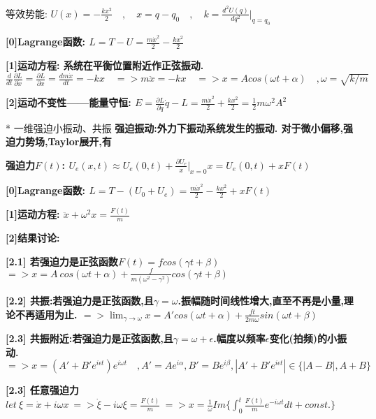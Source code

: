             等效势能:
            $U(x) = - \frac{k x^2}{2} \quad , \quad x = q-q_0 \quad ,\quad k = \frac{d^2 U(q)}{dq^2}|_{q=q_0}$
            
            \bf{[0]Lagrange函数}:
            $L = T - U = \frac{m \dot x^2}{2} - \frac{k x^2}{2}$
            
            \bf{[1]运动方程}: 系统在平衡位置附近作正弦振动.
            $\frac{d}{dt} \frac{∂ L}{∂ \dot x} = \frac{∂ L}{∂ x} = \frac{d m\dot x}{dt} = -kx \quad => m \ddot x = -kx \quad => x = A cos(\omega t + \alpha) \quad , \omega = \sqrt{k/m}$
            
            \bf{[2]运动不变性——能量守恒}:
            $E = \frac{∂ L}{∂ \dot q}\dot q - L = \frac{m \dot x^2}{2} + \frac{k x^2}{2} = \frac{1}{2} m \omega^2 A^2$


        * 一维强迫小振动、共振
            \bf{强迫振动}:外力下振动系统发生的振动. 对于微小偏移,强迫力势场,Taylor展开,有
            
            \bf{强迫力$F(t)$}:
                $U_e(x,t) \approx U_e(0,t) + \frac{∂ U_e}{x}|_{x=0}x = U_e(0,t) + xF(t)$
            
            \bf{[0]Lagrange函数}:
                $L = T - (U_0 + U_e) = \frac{m \dot x^2}{2} - \frac{k x^2}{2} + xF(t)$
            
            \bf{[1]运动方程}:
                $\ddot x + \omega^2 x = \frac{F(t)}{m}$
            
            \bf{[2]结果讨论}:
            
            \bf{[2.1]} 若强迫力是正弦函数$F(t) = f cos(\gamma t + \beta)$
                $ => x = A\ cos(\omega t + \alpha) + \frac{f}{m(\omega^2 - \gamma^2)} cos(\gamma t + \beta)$
                
            \bf{[2.2]} \bf{共振}:若强迫力是正弦函数,且$\gamma = \omega$.\quad 振幅随时间线性增大,直至不再是小量,理论不再适用为止.
            $ => \lim_{\gamma \to \omega}x = A'cos(\omega t + \alpha) + \frac{f t}{2m\omega} sin(\omega t + \beta)$
            
            \bf{[2.3]} 共振附近:若强迫力是正弦函数,且$\gamma = \omega + \epsilon$.\quad 幅度以频率$\epsilon$变化(\bf{拍频})的小振动.
            $ => x = (A' + B' e^{i\epsilon t})e^{i\omega t} \quad ,A' = Ae^{i\alpha},B' = Be^{i\beta},|A' + B' e^{i\epsilon t}| \in \{|A-B|,A+B\} $
            
            \bf{[2.3]} 任意强迫力
            $let\ \xi = \dot x + i\omega x\ => \dot \xi - i\omega \xi = \frac{F(t)}{m}  \ => x = \frac{1}{\omega}Im\{\int_0^t \frac{F(t)}{m}e^{-i\omega t}dt + const.\}$


